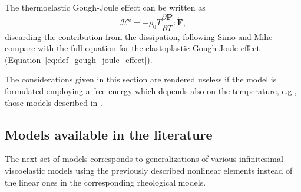 The thermoelastic Gough-Joule effect can be written as
\begin{equation}
	\mathcal H^\text{e} = -\rho_0T\frac{\partial \bm P}{\partial T}:\dot{\bm F},
\end{equation}
discarding the contribution from the dissipation, following Simo and Mihe \citep{simoAssociativeCoupledThermoplasticity1992}--compare with the full equation for the elastoplastic Gough-Joule effect (Equation~\eqref{eq:def_gough_joule_effect}).

The considerations given in this section are rendered useless if the model is formulated employing a free energy which depends also on the temperature, e.g., those models described in  \cite{anandThermomechanicallyCoupledTheory2009, amesThermomechanicallyCoupledTheory2009}.

\subsection{Models available in the literature}
\label{sec:rheo_models}


The next set of models corresponds to generalizations of various infinitesimal viscoelastic models using the previously described nonlinear elements instead of the linear ones in the corresponding rheological models.

